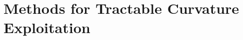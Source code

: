 
\section{Methods for Tractable Curvature Exploitation}
\label{sec:tractable_curvature_exploitation}




